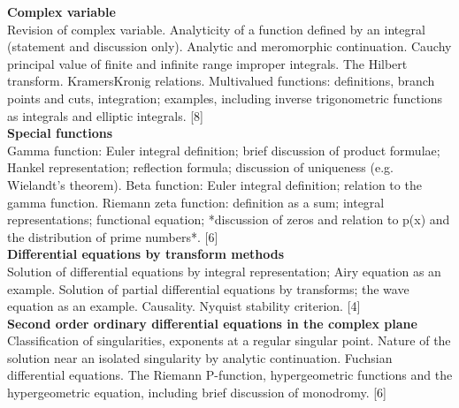 \documentclass[a4paper]{article}
\begin{document}
\maketitle
{\small
\noindent\textbf{Complex variable}\\
Revision of complex variable. Analyticity of a function defined by an integral (statement and discussion
only). Analytic and meromorphic continuation.
Cauchy principal value of finite and infinite range improper integrals. The Hilbert transform. KramersKronig relations.
Multivalued functions: definitions, branch points and cuts, integration; examples, including inverse
trigonometric functions as integrals and elliptic integrals. 
\hspace*{\fill} [8]
\vspace{10pt}\\
\noindent\textbf{Special functions}\\
Gamma function: Euler integral definition; brief discussion of product formulae; Hankel representation;
reflection formula; discussion of uniqueness (e.g. Wielandt’s theorem). Beta function: Euler integral
definition; relation to the gamma function. Riemann zeta function: definition as a sum; integral
representations; functional equation; *discussion of zeros and relation to p(x) and the distribution of
prime numbers*.    
 \hspace*{\fill} [6]
 \vspace{10pt}\\
 \noindent\textbf{Differential equations by transform methods}\\
Solution of differential equations by integral representation; Airy equation as an example. Solution
of partial differential equations by transforms; the wave equation as an example. Causality. Nyquist
stability criterion.    \hspace*{\fill} [4]
  \vspace{10pt}\\
  \noindent\textbf{Second order ordinary differential equations in the complex plane}\\
Classification of singularities, exponents at a regular singular point. Nature of the solution near an
isolated singularity by analytic continuation. Fuchsian differential equations. The Riemann P-function,
hypergeometric functions and the hypergeometric equation, including brief discussion of monodromy.
\hspace*{\fill} [6]
}
\tableofcontents
\setcounter{section}{-1}
\end{document}
